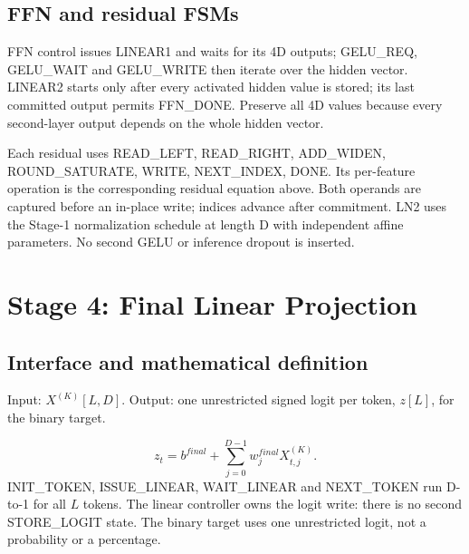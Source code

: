 \documentclass[11pt,a4paper]{article}
\begin{document}
\begin{center}
\end{center}

\subsection{FFN and residual FSMs}
FFN control issues LINEAR1 and waits for its 4D outputs; GELU\_REQ, GELU\_WAIT and GELU\_WRITE then iterate over the hidden vector. LINEAR2 starts only after every activated hidden value is stored; its last committed output permits FFN\_DONE. Preserve all 4D values because every second-layer output depends on the whole hidden vector.

Each residual uses READ\_LEFT, READ\_RIGHT, ADD\_WIDEN, ROUND\_SATURATE, WRITE, NEXT\_INDEX, DONE. Its per-feature operation is the corresponding residual equation above. Both operands are captured before an in-place write; indices advance after commitment. LN2 uses the Stage-1 normalization schedule at length D with independent affine parameters. No second GELU or inference dropout is inserted.

\section{Stage 4: Final Linear Projection}
\subsection{Interface and mathematical definition}
Input: $X^{(K)}[L,D]$. Output: one unrestricted signed logit per token, $z[L]$, for the binary target.

\[
z_t=b^{final}+\sum_{j=0}^{D-1}w^{final}_j X^{(K)}_{t,j}.
\]
INIT\_TOKEN, ISSUE\_LINEAR, WAIT\_LINEAR and NEXT\_TOKEN run D-to-1 for all $L$ tokens. The linear controller owns the logit write: there is no second STORE\_LOGIT state. The binary target uses one unrestricted logit, not a probability or a percentage.
\end{document}
